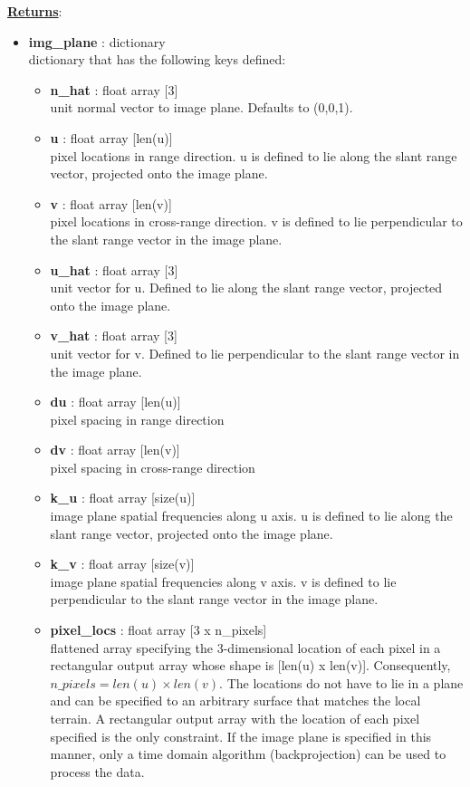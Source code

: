 \documentclass{article}
\newcommand{\defs}[2]{\textbf{{#1}} : {#2}}
\begin{document}
\noindent \underline{\textbf{Returns}}:
\begin{itemize}
	  	\item \defs{img\_plane}{dictionary}\\
	  	dictionary that has the following keys defined:
		\begin{itemize}
			\item\defs{n\_hat}{float array [3]}\\
				unit normal vector to image plane.  Defaults to (0,0,1).
			\item \defs{u}{float array [len(u)]}\\
		    	pixel locations in range direction.  u is defined to lie along the slant range vector, projected onto the image plane.
			\item \defs{v}{float array [len(v)]}\\
		    	pixel locations in cross-range direction.  v is defined to lie perpendicular to the slant range vector in the image plane.
   			\item \defs{u\_hat}{float array [3]}\\
   		    	unit vector for u.  Defined to lie along the slant range vector, projected onto the image plane.
   			\item \defs{v\_hat}{float array [3]}\\
   		    	unit vector for v.  Defined to lie perpendicular to the slant range vector in the image plane.
			\item \defs{du}{float array [len(u)]}\\
		    	pixel spacing in range direction
			\item \defs{dv}{float array [len(v)]}\\
		    	pixel spacing in cross-range direction
		    \item \defs{k\_u}{float array [size(u)]}\\
		    	image plane spatial frequencies along u axis.  u is defined to lie along the slant range vector, projected onto the image plane.
		    \item \defs{k\_v}{float array [size(v)]}\\
		    	image plane spatial frequencies along v axis.  v is defined to lie perpendicular to the slant range vector in the image plane.
		    \item \defs{pixel\_locs}{float array [3 x n\_pixels]}\\
		    	flattened array specifying the 3-dimensional location of each pixel in a rectangular output array whose shape is [len(u) x len(v)].  Consequently, $n\_pixels = len(u) \times len(v)$.  The locations do not have to lie in a plane and can be specified to an arbitrary surface that matches the local terrain.  A rectangular output array with the location of each pixel specified is the only constraint.  If the image plane is specified in this manner, only a time domain algorithm (backprojection) can be used to process the data.
		\end{itemize}
\end{itemize}
\end{document}
